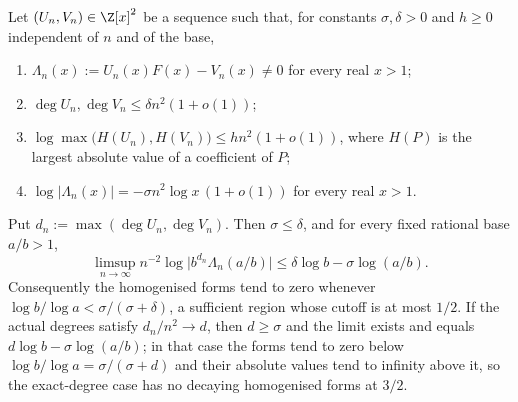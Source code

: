 \begin{theorem}\label{long1049:res:archcap}
Let $(U_n,V_n)\in\Z[x]^{2}$ be a sequence such that, for constants
$\sigma,\delta>0$ and $h\ge0$ independent of $n$ and of the base,
\begin{enumerate}
\item $\Lambda_n(x):=U_n(x)F(x)-V_n(x)\ne0$ for every real $x>1$;
\item $\deg U_n,\deg V_n\le\delta n^{2}(1+o(1))$;
\item $\log\max\bigl(H(U_n),H(V_n)\bigr)\le hn^{2}(1+o(1))$, where $H(P)$ is the
largest absolute value of a coefficient of $P$;
\item $\log|\Lambda_n(x)|=-\sigma n^{2}\log x\,(1+o(1))$ for every real $x>1$.
\end{enumerate}
Put $d_n:=\max(\deg U_n,\deg V_n)$.  Then $\sigma\le\delta$, and for every fixed
rational base $a/b>1$,
\[
 \limsup_{n\to\infty}n^{-2}\log\bigl|b^{d_n}\Lambda_n(a/b)\bigr|
 \le\delta\log b-\sigma\log(a/b).
\]
Consequently the homogenised forms tend to zero whenever
$\log b/\log a<\sigma/(\sigma+\delta)$, a sufficient region whose cutoff is at
most $1/2$.  If the actual degrees satisfy $d_n/n^{2}\to d$, then $d\ge\sigma$
and the limit exists and equals $d\log b-\sigma\log(a/b)$; in that case the
forms tend to zero below $\log b/\log a=\sigma/(\sigma+d)$ and their absolute
values tend to infinity above it, so the exact-degree case has no decaying
homogenised forms at $3/2$.
\end{theorem}

